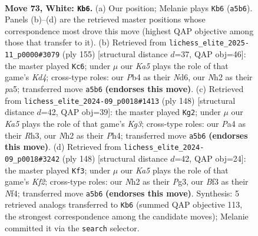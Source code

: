 \documentclass[11pt]{article}
\begin{document}
\clearpage

\begin{figure}[p]\centering
\begin{subfigure}{0.46\textwidth}\centering
\resizebox{\linewidth}{!}{%
\newchessgame
\chessboard[
  setfen={2b5/B4k2/8/K5r1/PP6/5B1p/1R5N/8 w - - 3 73},
  showmover=false,
  pgfstyle=straightmove, color=movearrow, markmove={a5-b6}
]}
\caption{}
\end{subfigure}\hfill
\begin{subfigure}{0.46\textwidth}\centering
\resizebox{\linewidth}{!}{%
\newchessgame
\chessboard[
  setfen={8/8/p2n4/Pbpk3R/5K2/8/8/4B3 b - - 34 78},
  showmover=false,
  pgfstyle=straightmove, color=movearrow, markmove={d5-c6}
]}
\caption{}
\end{subfigure}
\\[4pt]
\begin{subfigure}{0.46\textwidth}\centering
\resizebox{\linewidth}{!}{%
\newchessgame
\chessboard[
  setfen={8/8/8/2k1Bp1p/5P1P/3r2KR/8/8 w - - 5 75},
  showmover=false,
  pgfstyle=straightmove, color=movearrow, markmove={g3-g2}
]}
\caption{}
\end{subfigure}\hfill
\begin{subfigure}{0.46\textwidth}\centering
\resizebox{\linewidth}{!}{%
\newchessgame
\chessboard[
  setfen={6r1/3k4/8/5R2/5N2/2R3P1/4PK1r/8 w - - 5 75},
  showmover=false,
  pgfstyle=straightmove, color=movearrow, markmove={f2-f3}
]}
\caption{}
\end{subfigure}
\caption{\textbf{Move 73, White: \texttt{Kb6}.} (a) Our position; Melanie plays \texttt{Kb6} (\texttt{a5b6}). Panels (b)--(d) are the retrieved master positions whose correspondence most drove this move (highest QAP objective among those that transfer to it). (b) Retrieved from \texttt{lichess\_elite\_2025-11\_p0000\#3079} (ply 155) [structural distance $d$=37, QAP obj=46]: the master played \texttt{Kc6}; under $\mu$ our \emph{Ka5} plays the role of that game's \emph{Kd4}; cross-type roles: our \emph{P}b4 as their \emph{N}d6, our \emph{N}h2 as their \emph{p}a5; transferred move \texttt{a5b6} \textbf{(endorses this move)}. (c) Retrieved from \texttt{lichess\_elite\_2024-09\_p0018\#1413} (ply 148) [structural distance $d$=42, QAP obj=39]: the master played \texttt{Kg2}; under $\mu$ our \emph{Ka5} plays the role of that game's \emph{Kg3}; cross-type roles: our \emph{P}a4 as their \emph{R}h3, our \emph{N}h2 as their \emph{P}h4; transferred move \texttt{a5b6} \textbf{(endorses this move)}. (d) Retrieved from \texttt{lichess\_elite\_2024-09\_p0018\#3242} (ply 148) [structural distance $d$=42, QAP obj=24]: the master played \texttt{Kf3}; under $\mu$ our \emph{Ka5} plays the role of that game's \emph{Kf2}; cross-type roles: our \emph{N}h2 as their \emph{P}g3, our \emph{B}f3 as their \emph{N}f4; transferred move \texttt{a5b6} \textbf{(endorses this move)}. Synthesis: 5 retrieved analogs transferred to \texttt{Kb6} (summed QAP objective 113, the strongest correspondence among the candidate moves); Melanie committed it via the \texttt{search} selector.}
\label{fig:thought-m144}
\end{figure}
\end{document}
